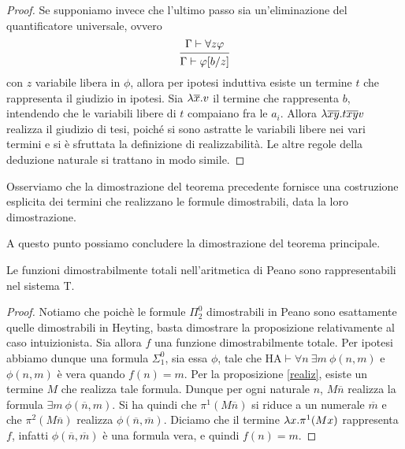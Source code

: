 \documentclass[]{marticle}
\begin{document}
\begin{proof}
    Se supponiamo invece che l'ultimo passo sia un'eliminazione del
    quantificatore universale, ovvero
    \[
        \begin{prooftree}
            \hypo{\Gamma\vdash \forall z \phi}
            \infer1{\Gamma\vdash \phi\sub{b}{z}}
        \end{prooftree}
    \]
    con $z$ variabile libera in $\phi$, allora per ipotesi induttiva esiste un
    termine $t$ che rappresenta il giudizio in ipotesi. Sia $\lambda \overline{x}. v$
    il termine che rappresenta $b$, intendendo che le variabili libere di $t$
    compaiano fra le $a_i$. Allora $\lambda \overline{x}\overline{y}. t\overline{x}
    \overline{y}v$ realizza il giudizio di tesi, poich\'e si sono astratte le
    variabili libere nei vari termini e si \`e sfruttata la definizione di
    realizzabilit\`a.
    Le altre regole della deduzione naturale si trattano in modo simile.
\end{proof}

Osserviamo che la dimostrazione del teorema precedente fornisce una costruzione
esplicita dei termini che realizzano le formule dimostrabili, data la loro
dimostrazione.

A questo punto possiamo concludere la dimostrazione del teorema principale.
\begin{block}[Proposizione]
    Le funzioni dimostrabilmente totali nell'aritmetica di Peano sono
    rappresentabili nel sistema T.
\end{block}
\begin{proof}
    Notiamo che poich\`e le formule $\Pi^0_2$ dimostrabili in Peano sono
    esattamente quelle dimostrabili in Heyting, basta dimostrare la
    proposizione relativamente al caso intuizionista. Sia allora $f$ una
    funzione dimostrabilmente totale.
    Per ipotesi abbiamo dunque una formula $\Sigma^0_1$, sia essa $\phi$, tale
    che $\text{HA} \vdash \forall n\ \exists m\ \phi(n,m)$ e $\phi(n,m)$ \`e
    vera quando $f(n)=m$. Per la proposizione \ref{realiz}, esiste un termine $M$
    che realizza tale formula. Dunque per ogni naturale $n$, $M\overline{n}$
    realizza la formula $\exists m\ \phi(\overline{n}, m)$. Si ha quindi che
    $\pi^1(M\overline{n})$ si riduce a un numerale $\overline{m}$ e che
    $\pi^2(M\overline{n})$ realizza $\phi(\overline{n}, \overline{m})$. Diciamo
    che il termine $\lambda x. \pi^1 (Mx)$ rappresenta $f$, infatti $\phi(
    \overline{n}, \overline{m})$ \`e una formula vera, e quindi $f(n)=m$.
\end{proof}
\end{document}
